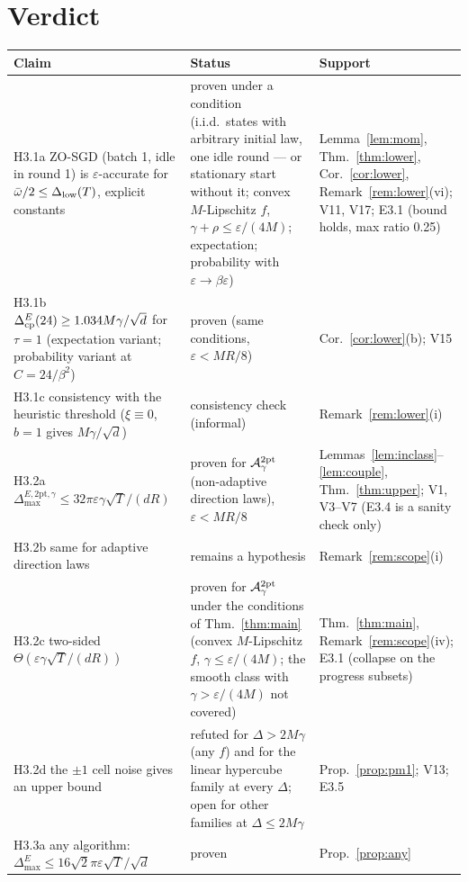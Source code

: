 \documentclass[11pt,a4paper]{article}
\numberwithin{equation}{section}
\theoremstyle{definition}
\theoremstyle{remark}
\newcommand{\Dmax}{\Delta_{\max}}\newcommand{\Dcp}{\Delta_{\rm cp}}\newcommand{\Dlow}{\Delta_{\rm low}}
\newcommand{\wbar}{\bar\omega}\newcommand{\Atwo}{\cA^{\rm 2pt}_\gamma}
\begin{document}
\section{Verdict}\label{sec:verdict}
{\small
\begin{xltabular}{\textwidth}{@{}>{\raggedright\arraybackslash}p{5.3cm}>{\raggedright\arraybackslash}p{4.6cm}>{\raggedright\arraybackslash}X@{}}
\toprule
Claim & Status & Support\\
\midrule
\endhead
H3.1a ZO-SGD (batch 1, idle in round 1) is $\varepsilon$-accurate for $\wbar/2\le\Dlow(T)$, explicit constants & proven under a condition (i.i.d.\ states with arbitrary initial law, one idle round --- or stationary start without it; convex $M$-Lipschitz $f$, $\gamma+\rho\le\varepsilon/(4M)$; expectation; probability with $\varepsilon\to\beta\varepsilon$) & Lemma~\ref{lem:mom}, Thm.~\ref{thm:lower}, Cor.~\ref{cor:lower}, Remark~\ref{rem:lower}(vi); V11, V17; E3.1 (bound holds, max ratio 0.25)\\
H3.1b $\Dcp^E(24)\ge1.034M\gamma/\sqrt d$ for $\tau=1$ (expectation variant; probability variant at $C=24/\beta^2$) & proven (same conditions, $\varepsilon<MR/8$) & Cor.~\ref{cor:lower}(b); V15\\
H3.1c consistency with the heuristic threshold ($\xi\equiv0$, $b=1$ gives $M\gamma/\sqrt d$) & consistency check (informal) & Remark~\ref{rem:lower}(i)\\
H3.2a $\Dmax^{E,\mathrm{2pt},\gamma}\le32\pi\varepsilon\gamma\sqrt T/(dR)$ & proven for $\Atwo$ (non-adaptive direction laws), $\varepsilon<MR/8$ & Lemmas~\ref{lem:inclass}--\ref{lem:couple}, Thm.~\ref{thm:upper}; V1, V3--V7 (E3.4 is a sanity check only)\\
H3.2b same for adaptive direction laws & remains a hypothesis & Remark~\ref{rem:scope}(i)\\
H3.2c two-sided $\Theta(\varepsilon\gamma\sqrt T/(dR))$ & proven for $\Atwo$ under the conditions of Thm.~\ref{thm:main} (convex $M$-Lipschitz $f$, $\gamma\le\varepsilon/(4M)$; the smooth class with $\gamma>\varepsilon/(4M)$ not covered) & Thm.~\ref{thm:main}, Remark~\ref{rem:scope}(iv); E3.1 (collapse on the progress subsets)\\
H3.2d the $\pm1$ cell noise gives an upper bound & refuted for $\Delta>2M\gamma$ (any $f$) and for the linear hypercube family at every $\Delta$; open for other families at $\Delta\le2M\gamma$ & Prop.~\ref{prop:pm1}; V13; E3.5\\
H3.3a any algorithm: $\Dmax^E\le16\sqrt2\pi\varepsilon\sqrt T/\sqrt d$ & proven & Prop.~\ref{prop:any}\\

\end{xltabular}}
\end{document}

